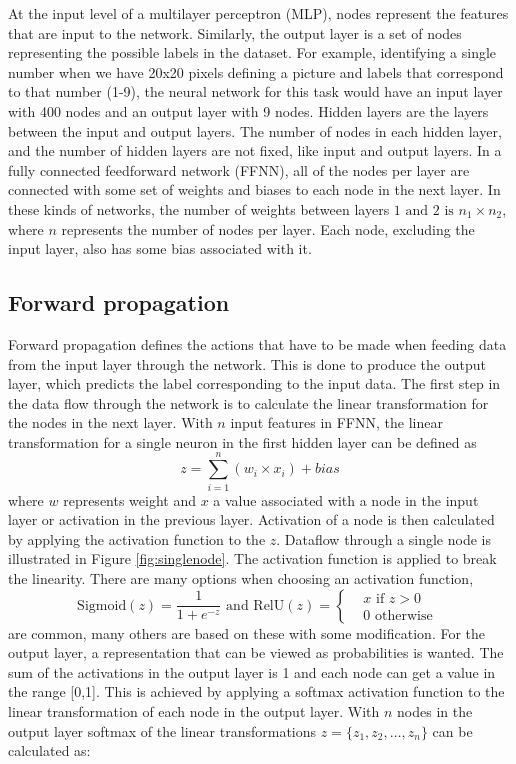 At the input level of a multilayer perceptron (MLP), nodes represent the features that are input to the network. Similarly, the output layer is a set of nodes representing the possible labels in the dataset. For example, identifying a single number when we have 20x20 pixels defining a picture and labels that correspond to that number (1-9), the neural network for this task would have an input layer with 400 nodes and an output layer with 9 nodes. Hidden layers are the layers between the input and output layers. The number of nodes in each hidden layer, and the number of hidden layers are not fixed, like input and output layers. In a fully connected feedforward network (FFNN), all of the nodes per layer are connected with some set of weights and biases to each node in the next layer. In these kinds of networks, the number of weights between layers \({1} \text{ and } {2} \text{ is }  n_{1} \times n_{2}\), where \(n\) represents the number of nodes per layer. Each node, excluding the input layer, also has some bias associated with it. 


\subsection{Forward propagation}

Forward propagation defines the actions that have to be made when feeding data from the input layer through the network. This is done to produce the output layer, which predicts the label corresponding to the input data. The first step in the data flow through the network is to calculate the linear transformation for the nodes in the next layer. With \(n\) input features in FFNN, the linear transformation for a single neuron in the first hidden layer can be defined as
\[z = \sum_{i = 1}^{n} (w_{i} \times x_{i}) + bias\]
where \(w\) represents weight and \(x\) a value associated with a node in the input layer or activation in the previous layer. Activation of a node is then calculated by applying the activation function to the \(z\). Dataflow through a single node is illustrated in Figure {\ref{fig:singlenode}}. The activation function is applied to break the linearity. There are many options when choosing an activation function,  
\[\mathrm{Sigmoid}(z) = {\frac{1}{1+e^{-z}}}
\text{ and }    
\mathrm{RelU}(z) = \begin{cases}
 &x \text{ if } z > 0\\ 
 &0 \text{ otherwise } 
\end{cases}\]
are common, many others are based on these with some modification. For the output layer, a representation that can be viewed as probabilities is wanted. The sum of the activations in the output layer is 1 and each node can get a value in the range [0,1]. This is achieved by applying a softmax activation function to the linear transformation of each node in the output layer. With \(n\) nodes in the output layer softmax of the linear transformations \(z = \{ {z}_1, {z}_2, \ldots,{z}_n \}\) can be calculated as:

